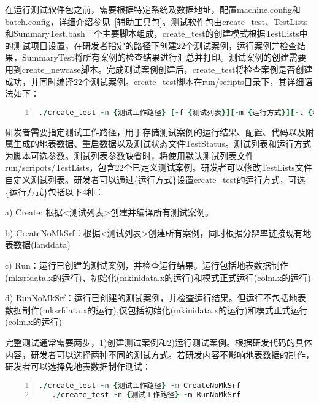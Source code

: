 在运行测试软件包之前，需要根据特定系统及数据地址，配置machine.config和batch.config，详细介绍参见~\ref{辅助工具包}。测试软件包由create\_test、TestLists和SummaryTest.bash三个主要脚本组成，create\_test的创建模式根据TestLists中的测试项目设置，在研发者指定的路径下创建22个测试案例，运行案例并检查结果，SummaryTest将所有案例的检查结果进行汇总并打印。测试案例的创建需要用到create\_newcase脚本。完成测试案例创建后，create\_test将检查案例是否创建成功，并同时编译22个测试案例。create\_test脚本在run/scripts目录下，其详细语法如下：

\begin{lstlisting}[language=fortran, basicstyle=\linespread{1.0}\footnotesize\ttfamily, commentstyle=\color{black}, numbers=left, numberstyle=\tiny, xleftmargin=1.5em,xrightmargin=0em, aboveskip=1em]
   ./create_test -n {测试工作路径} [-f {测试列表}][-m {运行方式}][-t {测试类型} [-r {重启时间}]]
\end{lstlisting}

研发者需要指定{测试工作路径}，用于存储测试案例的运行结果、配置、代码以及附属生成的地表数据、重启数据以及测试状态文件TestStatus。{测试列表}和{运行方式}为脚本可选参数。{测试列表}参数缺省时，将使用默认测试列表文件run/scripots/TestLists，包含22个已定义测试案例。研发者可以修改TestLists文件自定义测试列表。研发者可以通过\{运行方式\}设置create\_test的运行方式，可选\{运行方式\}包括以下4种：

a) Create: 根据<测试列表>创建并编译所有测试案例。

b) CreateNoMkSrf：根据<测试列表>创建所有案例，同时根据分辨率链接现有地表数据(landdata)

c) Run：运行已创建的测试案例，并检查运行结果。运行包括地表数据制作(mksrfdata.x的运行)、初始化(mkinidata.x的运行)和模式正式运行(colm.x的运行)

d) RunNoMkSrf：运行已创建的测试案例，并检查运行结果。但运行不包括地表数据制作(mksrfdata.x的运行),仅包括初始化(mkinidata.x的运行)和模式正式运行(colm.x的运行)

完整测试通常需要两步，1)创建测试案例和2)运行测试案例。根据研发代码的具体内容，研发者可以选择两种不同的测试方式。若研发内容不影响地表数据的制作，研发者可以选择免地表数据制作测试：

\begin{lstlisting}[language=fortran, basicstyle=\linespread{1.0}\footnotesize\ttfamily, commentstyle=\color{black}, numbers=left, numberstyle=\tiny, xleftmargin=1.5em,xrightmargin=0em, aboveskip=1em]
   ./create_test -n {测试工作路径} -m CreateNoMkSrf
   ./create_test -n {测试工作路径} -m RunNoMkSrf
\end{lstlisting}

